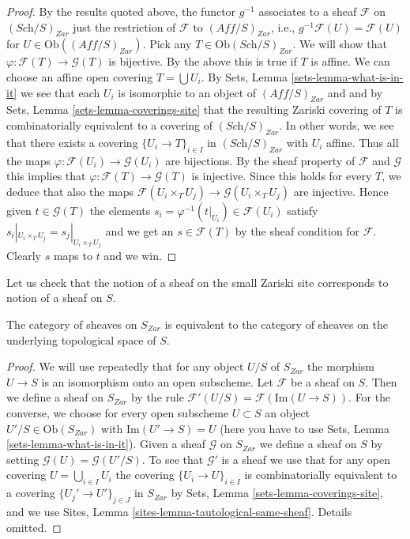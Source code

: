 \begin{proof}
\medskip\noindent
By the results quoted above,
the functor $g^{-1}$ associates to a sheaf $\mathcal{F}$ on
$(\textit{Sch}/S)_{Zar}$ just the restriction of $\mathcal{F}$
to $(\textit{Aff}/S)_{Zar}$, i.e., $g^{-1}\mathcal{F}(U) = \mathcal{F}(U)$
for $U \in \text{Ob}((\textit{Aff}/S)_{Zar})$. Pick any
$T \in \text{Ob}(\textit{Sch}/S)_{Zar}$. We will show that
$\varphi : \mathcal{F}(T) \to \mathcal{G}(T)$ is bijective.
By the above this is true if $T$ is affine.
We can choose an affine open covering $T = \bigcup U_i$. By
Sets, Lemma \ref{sets-lemma-what-is-in-it} we see that
each $U_i$ is isomorphic to an object of $(\textit{Aff}/S)_{Zar}$
and and by Sets, Lemma \ref{sets-lemma-coverings-site}
that the resulting Zariski covering of $T$ is combinatorially
equivalent to a covering of $(\textit{Sch}/S)_{Zar}$.
In other words, we see that there exists a covering
$\{U_i \to T\}_{i \in I}$ in $(\textit{Sch}/S)_{Zar}$ with $U_i$ affine.
Thus all the maps $\varphi : \mathcal{F}(U_i) \to \mathcal{G}(U_i)$
are bijections. By the sheaf property of $\mathcal{F}$ and $\mathcal{G}$
this implies that $\varphi : \mathcal{F}(T) \to \mathcal{G}(T)$ is injective.
Since this holds for every $T$, we deduce that also the maps
$\mathcal{F}(U_i \times_T U_j) \to \mathcal{G}(U_i \times_T U_j)$
are injective. Hence given $t \in \mathcal{G}(T)$
the elements $s_i = \varphi^{-1}(t|_{U_i}) \in \mathcal{F}(U_i)$
satisfy $s_i|_{U_i \times_T U_j} = s_j|_{U_i \times_T U_j}$
and we get an $s \in \mathcal{F}(T)$ by the sheaf condition
for $\mathcal{F}$. Clearly $s$ maps to $t$ and we win.
\end{proof}

\noindent
Let us check that the notion of a sheaf on the small Zariski site
corresponds to notion of a sheaf on $S$.

\begin{lemma}
\label{lemma-Zariski-usual}
The category of sheaves on $S_{Zar}$ is equivalent to the
category of sheaves on the underlying topological space of $S$.
\end{lemma}

\begin{proof}
We will use repeatedly that for any object
$U/S$ of $S_{Zar}$ the morphism $U \to S$ is an isomorphism
onto an open subscheme.
Let $\mathcal{F}$ be a sheaf on $S$. Then we define a sheaf
on $S_{Zar}$ by the rule $\mathcal{F}'(U/S) = \mathcal{F}(\text{Im}(U \to S))$.
For the converse, we choose for every open subscheme $U \subset S$ an object
$U'/S \in \text{Ob}(S_{Zar})$ with $\text{Im}(U' \to S) = U$
(here you have to use Sets, Lemma \ref{sets-lemma-what-is-in-it}).
Given a sheaf $\mathcal{G}$ on $S_{Zar}$ we define a sheaf on $S$ by setting
$\mathcal{G}(U) = \mathcal{G}(U'/S)$. To see that $\mathcal{G}'$ is
a sheaf we use that for any open covering $U = \bigcup_{i \in I} U_i$
the covering $\{U_i \to U\}_{i \in I}$
is combinatorially equivalent to a covering $\{U_j' \to U'\}_{j \in J}$
in $S_{Zar}$ by Sets, Lemma \ref{sets-lemma-coverings-site},
and we use Sites, Lemma \ref{sites-lemma-tautological-same-sheaf}.
Details omitted.
\end{proof}

